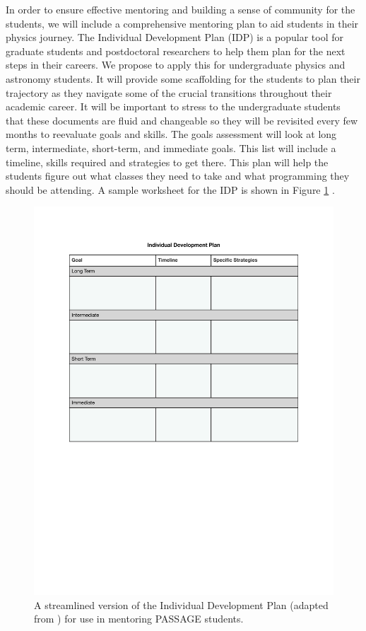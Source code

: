 \documentclass[12pt]{article}
\begin{document}
In order to ensure effective mentoring and building a sense of community for the students, we will include a comprehensive mentoring plan to aid students in their physics journey.  The Individual Development Plan (IDP) is a popular tool for graduate students and postdoctoral researchers to help them plan for the next steps in their careers. We propose to apply this for undergraduate physics and astronomy students.  It will provide some scaffolding for the students to plan their trajectory as they navigate some of the crucial transitions throughout their academic career.  It will be important to stress to the undergraduate students that these documents are fluid and changeable so they will be revisited every few months to reevaluate goals and skills.  %
The goals assessment will look at long term, intermediate, short-term, and immediate goals. This list will include a timeline, skills required and strategies to get there. 
This plan will help the students figure out what classes they need to take and what programming they should be attending. A sample worksheet for the IDP is shown in Figure \ref{fig:IDP} \citep{Bosch}.  

\begin{figure}
    \centering
    \includegraphics[width=5in]{IDP.pdf}
    \caption{A streamlined version of the Individual Development Plan (adapted from \citet{Bosch}) for use in mentoring PASSAGE students.}
    \label{fig:IDP}
\end{figure}
\end{document}
